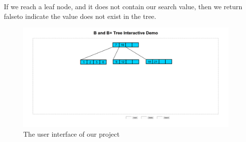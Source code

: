 If we reach a leaf node, and it does not contain our search value,
then we return falseto indicate the value does not exist in the tree.

\begin{figure}[htp]
\centering
\includegraphics[scale=0.25]{images/Interface.png}
\caption{The user interface of our project}
\label{UI}
\end{figure}
